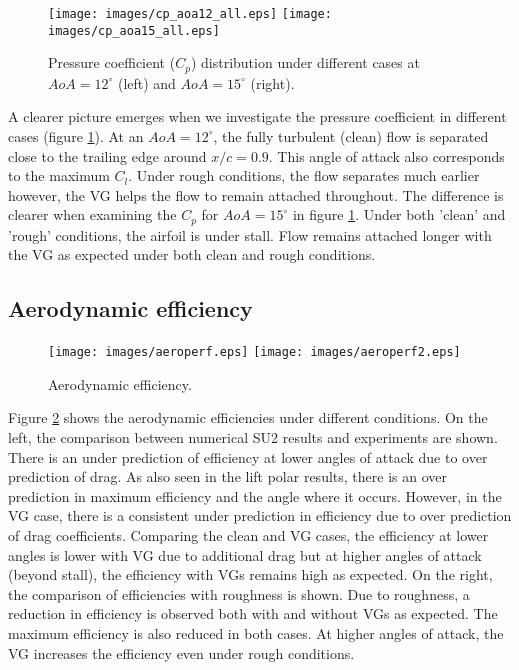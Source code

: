 \begin{figure}[h]
    \centering
    \texttt{[image: images/cp\_aoa12\_all.eps]}
    \texttt{[image: images/cp\_aoa15\_all.eps]} 
    \vspace*{-0.5cm}
    \caption{Pressure coefficient ($C_p$) distribution under different cases at $AoA = 12^{\circ}$ (left) and $AoA = 15^{\circ}$ (right).}
   \label{fig:cpallaoa}
\end{figure}

A clearer picture emerges when we investigate the pressure coefficient in different cases (figure \ref{fig:cpallaoa}). At an $AoA=12^{\circ}$, the fully turbulent (clean) flow is separated close to the trailing edge around $x/c=0.9$. This angle of attack also corresponds to the maximum $C_l$. Under rough conditions, the flow separates much earlier however, the VG helps the flow to remain attached throughout. The difference is clearer when examining the $C_p$ for $AoA=15^{\circ}$ in figure \ref{fig:cpallaoa}. Under both 'clean' and 'rough' conditions, the airfoil is under stall. Flow remains attached longer with the VG as expected under both clean and rough conditions. 
\subsection{Aerodynamic efficiency}
\begin{figure}[h]
    \centering
    \texttt{[image: images/aeroperf.eps]}
    \texttt{[image: images/aeroperf2.eps]} 
    \vspace*{-0.5cm}
    \caption{Aerodynamic efficiency.}
   \label{fig:aeroeff}
\end{figure}
Figure \ref{fig:aeroeff} shows the aerodynamic efficiencies under different conditions. On the left, the comparison between numerical SU2 results and experiments are shown. There is an under prediction of efficiency at lower angles of attack due to over prediction of drag. As also seen in the lift polar results, there is an over prediction in maximum efficiency and the angle where it occurs. However, in the VG case, there is a consistent under prediction in efficiency due to over prediction of drag coefficients. Comparing the clean and VG cases, the efficiency at lower angles is lower with VG due to additional drag but at higher angles of attack (beyond stall), the efficiency with VGs remains high as expected. On the right, the comparison of efficiencies with roughness is shown. Due to roughness, a reduction in efficiency is observed both with and without VGs as expected. The maximum efficiency is also reduced in both cases. At higher angles of attack, the VG increases the efficiency even under rough conditions.
